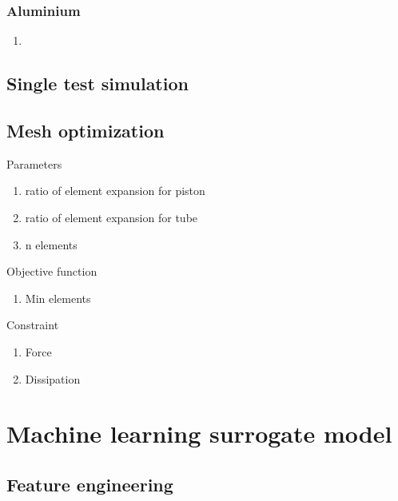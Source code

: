 \documentclass{article}
\begin{document}
\subsubsection{Aluminium}
\begin{enumerate}
	\item 
\end{enumerate}

\subsection{Single test simulation}

\subsection{Mesh optimization}

Parameters
\begin{enumerate}
	\item ratio of element expansion for piston
	\item ratio of element expansion for tube
	\item n elements
\end{enumerate}

Objective function
\begin{enumerate}
	\item Min elements
\end{enumerate}

Constraint
\begin{enumerate}
	\item Force
	\item Dissipation
\end{enumerate}

\section{Machine learning surrogate model}
\subsection{Feature engineering}
\end{document}
